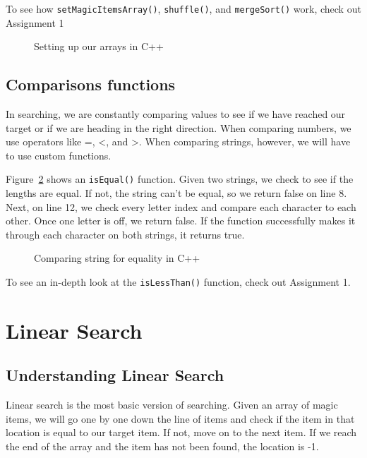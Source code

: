 \documentclass[letterpaper, 10pt,DIV=13]{scrartcl}
\numberwithin{equation}{section} %
\numberwithin{figure}{section} %
\numberwithin{table}{section} %
\begin{document}
 To see how \texttt{setMagicItemsArray()}, \texttt{shuffle()}, and \texttt{mergeSort()} work, check out Assignment 1


\begin{figure}[ht] 
    \centering 
    
    \caption{Setting up our arrays in C++}
    \label{figure:MainBegin}
\end{figure}

\pagebreak

\subsection{Comparisons functions}
In searching, we are constantly comparing values to see if we have reached our target or if we are heading in the right direction. When comparing numbers, we use operators like =, <, and >. When comparing strings, however, we will have to use custom functions. 

Figure~\ref{figure:IsEqual} shows an \texttt{isEqual()} function. Given two strings, we check to see if the lengths are equal. If not, the string can't be equal, so we return false on line 8. Next, on line 12, we check every letter index and compare each character to each other. Once one letter is off, we return false. If the function successfully makes it through each character on both strings, it returns true.

\begin{figure}[ht] 
    \centering 
    
    \caption{Comparing string for equality in C++}
    \label{figure:IsEqual}
\end{figure}


To see an in-depth look at the \texttt{isLessThan()} function, check out Assignment 1.


\section{Linear Search}

\subsection{Understanding Linear Search}
Linear search is the most basic version of searching. Given an array of magic items, we will go one by one down the line of items and check if the item in that location is equal to our target item. If not, move on to the next item. If we reach the end of the array and the item has not been found, the location is -1.
\end{document}
